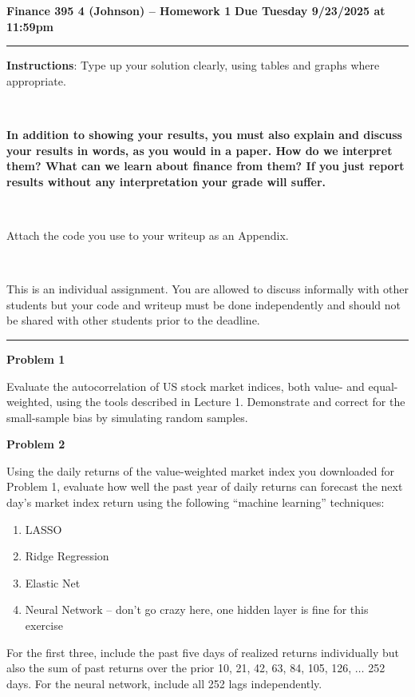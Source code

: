 \documentclass[12pt]{article}
\begin{document}
\thispagestyle{empty}
\begin{center}
{\Large \textbf{Finance 395 4 (Johnson) -- Homework 1}}
\vskip 12pt
{\normalsize \textbf{Due Tuesday 9/23/2025 at 11:59pm}}
\end{center}
\hrule 
\vskip 12pt
\textbf{Instructions}: Type up your solution clearly, using tables and graphs where appropriate.

~

\noindent \textbf{In addition to showing your results, you must also explain and discuss your results in words, as you would in a paper. How do we interpret them? What can we learn about finance from them? If you just report results without any interpretation your grade will suffer.}

~

\noindent Attach the code you use to your writeup as an Appendix.

~

\noindent This is an individual assignment. You are allowed to discuss informally with other students but your code and writeup must be done independently and should not be shared with other students prior to the deadline.
\vskip 12pt
\hrule 
\vskip 12pt

\noindent \textbf{Problem 1}

Evaluate the autocorrelation of US stock market indices, both value- and equal-weighted, using the tools described in Lecture 1. Demonstrate and correct for the small-sample bias by simulating random samples.

\vskip 12pt

\noindent \textbf{Problem 2}

Using the daily returns of the value-weighted market index you downloaded for Problem 1, evaluate how well the past year of daily returns can forecast the next day's market index return using the following ``machine learning'' techniques:
\begin{enumerate}
    \item LASSO
    \item Ridge Regression
    \item Elastic Net
    \item Neural Network -- don't go crazy here, one hidden layer is fine for this exercise
\end{enumerate}
For the first three, include the past five days of realized returns individually but also the sum of past returns over the prior 10, 21, 42, 63, 84, 105, 126, $\ldots$ 252 days. For the neural network, include all 252 lags independently.
\end{document}
